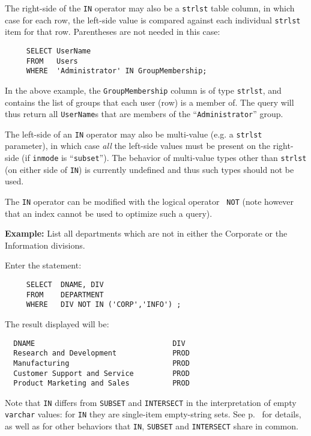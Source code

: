 The right-side of the {\tt IN} operator may also be a \verb`strlst`
table column, in which case for each row, the left-side value is
compared against each individual \verb`strlst` item for that row.
Parentheses are not needed in this case:
\begin{verbatim}
     SELECT UserName
     FROM   Users
     WHERE  'Administrator' IN GroupMembership;
\end{verbatim}
In the above example, the {\tt GroupMembership} column is of type
\verb`strlst`, and contains the list of groups that each user (row) is
a member of.  The query will thus return all {\tt UserName}s that are
members of the ``\verb`Administrator`'' group.

The left-side of an {\tt IN} operator may also be multi-value (e.g. a
\verb`strlst` parameter), in which case {\em all} the left-side values
must be present on the right-side (if \verb`inmode` is
``\verb`subset`'').  The behavior of multi-value types other than
\verb`strlst` (on either side of {\tt IN}) is currently undefined and
thus such types should not be used.

The {\tt IN} operator can be modified with the logical operator {\tt
NOT} (note however that an index cannot be used to optimize such a
query).

{\bf Example:}
List all departments which are not in either the Corporate or the
Information divisions.

Enter the statement:
\begin{verbatim}
     SELECT  DNAME, DIV
     FROM    DEPARTMENT
     WHERE   DIV NOT IN ('CORP','INFO') ;
\end{verbatim}
The result displayed will be:
\begin{screen}
\begin{verbatim}
  DNAME                                DIV
  Research and Development             PROD
  Manufacturing                        PROD
  Customer Support and Service         PROD
  Product Marketing and Sales          PROD
\end{verbatim}
\end{screen}

Note that {\tt IN} differs from {\tt SUBSET} and {\tt INTERSECT} in
the interpretation of empty {\tt varchar} values: for {\tt IN} they
are single-item empty-string sets.  See
p.~\pageref{InSubsetIntersectCommonality} for details, as well as for
other behaviors that {\tt IN}, {\tt SUBSET} and {\tt INTERSECT} share
in common.

